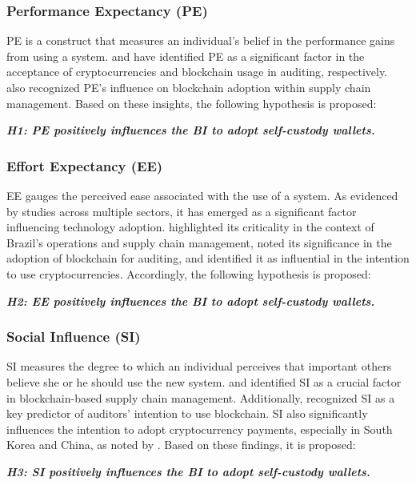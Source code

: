 \documentclass[twocolumn]{article}
\begin{document}
\subsubsection{Performance Expectancy (PE)}
PE is a construct that measures an individual's belief in the performance gains from using a system. \textcite{arias-oliva_fuzzy_2021} and \textcite{ferri_ascertaining_2021} have identified PE as a significant factor in the acceptance of cryptocurrencies and blockchain usage in auditing, respectively. \textcite{queiroz_blockchain_2019} also recognized PE's influence on blockchain adoption within supply chain management. Based on these insights, the following hypothesis is proposed:

\textbf{\textit{H1: PE positively influences the BI to adopt self-custody wallets.
}}
\subsubsection{Effort Expectancy (EE)}
EE gauges the perceived ease associated with the use of a system. As evidenced by studies across multiple sectors, it has emerged as a significant factor influencing technology adoption. \textcite{queiroz_blockchain_2021} highlighted its criticality in the context of Brazil's operations and supply chain management, \textcite{ferri_ascertaining_2021} noted its significance in the adoption of blockchain for auditing, and \textcite{arias-oliva_fuzzy_2021} identified it as influential in the intention to use cryptocurrencies. Accordingly, the following hypothesis is proposed:

\textbf{\textit{H2: EE positively influences the BI to adopt self-custody wallets.
}}
\subsubsection{Social Influence (SI)}
SI measures the degree to which an individual perceives that important others believe she or he should use the new system. \textcite{kabir_application_2021} and \textcite{queiroz_blockchain_2019} identified SI as a crucial factor in blockchain-based supply chain management. Additionally, \textcite{ferri_ascertaining_2021} recognized SI as a key predictor of auditors' intention to use blockchain. SI also significantly influences the intention to adopt cryptocurrency payments, especially in South Korea and China, as noted by \textcite{radic_you_2022}. Based on these findings, it is proposed:

\textbf{\textit{H3: SI positively influences the BI to adopt self-custody wallets.
}}
\end{document}
